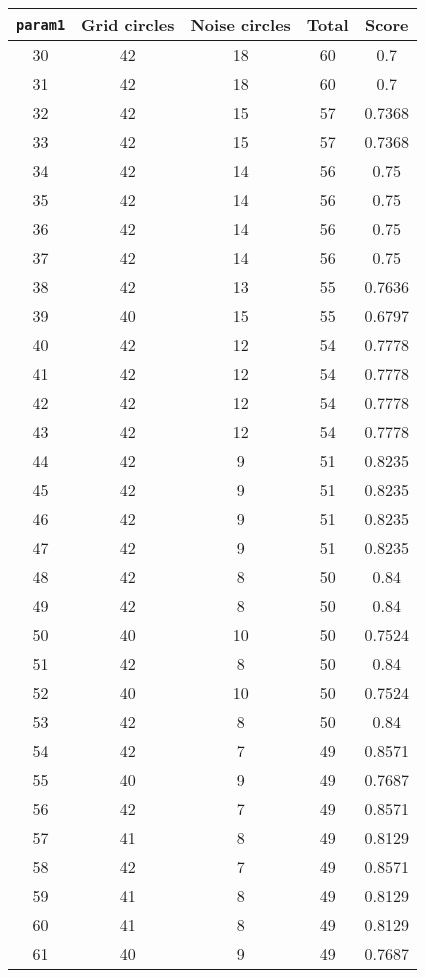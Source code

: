 \documentclass[letterpaper, 12pt]{article}
\begin{document}
\begin{longtable}{|c|c|c|c|c|}
\hline
\textbf{\texttt{param1}} & \textbf{Grid circles} & \textbf{Noise circles} & \textbf{Total} & \textbf{Score} \\
\hline
30 & 42 & 18 & 60 & 0.7 \\
\hline
31 & 42 & 18 & 60 & 0.7 \\
\hline
32 & 42 & 15 & 57 & 0.7368 \\
\hline
33 & 42 & 15 & 57 & 0.7368 \\
\hline
34 & 42 & 14 & 56 & 0.75 \\
\hline
35 & 42 & 14 & 56 & 0.75 \\
\hline
36 & 42 & 14 & 56 & 0.75 \\
\hline
37 & 42 & 14 & 56 & 0.75 \\
\hline
38 & 42 & 13 & 55 & 0.7636 \\
\hline
39 & 40 & 15 & 55 & 0.6797 \\
\hline
40 & 42 & 12 & 54 & 0.7778 \\
\hline
41 & 42 & 12 & 54 & 0.7778 \\
\hline
42 & 42 & 12 & 54 & 0.7778 \\
\hline
43 & 42 & 12 & 54 & 0.7778 \\
\hline
44 & 42 & 9 & 51 & 0.8235 \\
\hline
45 & 42 & 9 & 51 & 0.8235 \\
\hline
46 & 42 & 9 & 51 & 0.8235 \\
\hline
47 & 42 & 9 & 51 & 0.8235 \\
\hline
48 & 42 & 8 & 50 & 0.84 \\
\hline
49 & 42 & 8 & 50 & 0.84 \\
\hline
50 & 40 & 10 & 50 & 0.7524 \\
\hline
51 & 42 & 8 & 50 & 0.84 \\
\hline
52 & 40 & 10 & 50 & 0.7524 \\
\hline
53 & 42 & 8 & 50 & 0.84 \\
\hline
54 & 42 & 7 & 49 & 0.8571 \\
\hline
55 & 40 & 9 & 49 & 0.7687 \\
\hline
56 & 42 & 7 & 49 & 0.8571 \\
\hline
57 & 41 & 8 & 49 & 0.8129 \\
\hline
58 & 42 & 7 & 49 & 0.8571 \\
\hline
59 & 41 & 8 & 49 & 0.8129 \\
\hline
60 & 41 & 8 & 49 & 0.8129 \\
\hline
61 & 40 & 9 & 49 & 0.7687 \\

\end{longtable}
\end{document}

